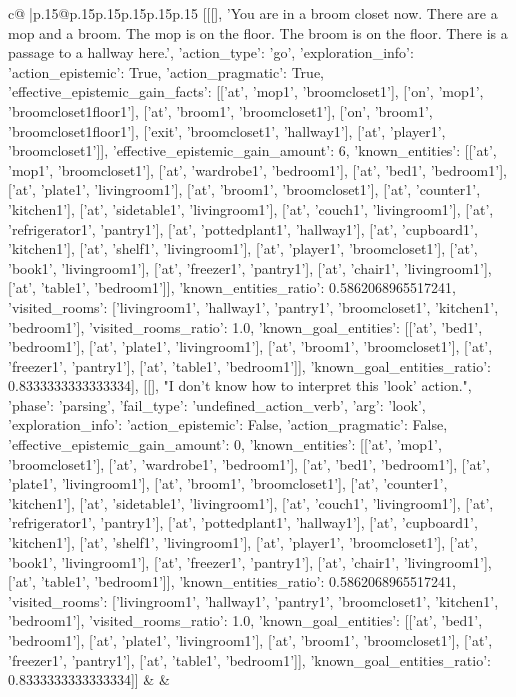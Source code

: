 \documentclass{article}
\begin{document}
{\begin{supertabular}{c@{$\;$}|p{.15\linewidth}@{}p{.15\linewidth}p{.15\linewidth}p{.15\linewidth}p{.15\linewidth}p{.15\linewidth}}
{{{	 [[[], 'You are in a broom closet now. There are a mop and a broom. The mop is on the floor. The broom is on the floor. There is a passage to a hallway here.', {'action_type': 'go', 'exploration_info': {'action_epistemic': True, 'action_pragmatic': True, 'effective_epistemic_gain_facts': [['at', 'mop1', 'broomcloset1'], ['on', 'mop1', 'broomcloset1floor1'], ['at', 'broom1', 'broomcloset1'], ['on', 'broom1', 'broomcloset1floor1'], ['exit', 'broomcloset1', 'hallway1'], ['at', 'player1', 'broomcloset1']], 'effective_epistemic_gain_amount': 6, 'known_entities': [['at', 'mop1', 'broomcloset1'], ['at', 'wardrobe1', 'bedroom1'], ['at', 'bed1', 'bedroom1'], ['at', 'plate1', 'livingroom1'], ['at', 'broom1', 'broomcloset1'], ['at', 'counter1', 'kitchen1'], ['at', 'sidetable1', 'livingroom1'], ['at', 'couch1', 'livingroom1'], ['at', 'refrigerator1', 'pantry1'], ['at', 'pottedplant1', 'hallway1'], ['at', 'cupboard1', 'kitchen1'], ['at', 'shelf1', 'livingroom1'], ['at', 'player1', 'broomcloset1'], ['at', 'book1', 'livingroom1'], ['at', 'freezer1', 'pantry1'], ['at', 'chair1', 'livingroom1'], ['at', 'table1', 'bedroom1']], 'known_entities_ratio': 0.5862068965517241, 'visited_rooms': ['livingroom1', 'hallway1', 'pantry1', 'broomcloset1', 'kitchen1', 'bedroom1'], 'visited_rooms_ratio': 1.0, 'known_goal_entities': [['at', 'bed1', 'bedroom1'], ['at', 'plate1', 'livingroom1'], ['at', 'broom1', 'broomcloset1'], ['at', 'freezer1', 'pantry1'], ['at', 'table1', 'bedroom1']], 'known_goal_entities_ratio': 0.8333333333333334}}], [[], "I don't know how to interpret this 'look' action.", {'phase': 'parsing', 'fail_type': 'undefined_action_verb', 'arg': 'look', 'exploration_info': {'action_epistemic': False, 'action_pragmatic': False, 'effective_epistemic_gain_amount': 0, 'known_entities': [['at', 'mop1', 'broomcloset1'], ['at', 'wardrobe1', 'bedroom1'], ['at', 'bed1', 'bedroom1'], ['at', 'plate1', 'livingroom1'], ['at', 'broom1', 'broomcloset1'], ['at', 'counter1', 'kitchen1'], ['at', 'sidetable1', 'livingroom1'], ['at', 'couch1', 'livingroom1'], ['at', 'refrigerator1', 'pantry1'], ['at', 'pottedplant1', 'hallway1'], ['at', 'cupboard1', 'kitchen1'], ['at', 'shelf1', 'livingroom1'], ['at', 'player1', 'broomcloset1'], ['at', 'book1', 'livingroom1'], ['at', 'freezer1', 'pantry1'], ['at', 'chair1', 'livingroom1'], ['at', 'table1', 'bedroom1']], 'known_entities_ratio': 0.5862068965517241, 'visited_rooms': ['livingroom1', 'hallway1', 'pantry1', 'broomcloset1', 'kitchen1', 'bedroom1'], 'visited_rooms_ratio': 1.0, 'known_goal_entities': [['at', 'bed1', 'bedroom1'], ['at', 'plate1', 'livingroom1'], ['at', 'broom1', 'broomcloset1'], ['at', 'freezer1', 'pantry1'], ['at', 'table1', 'bedroom1']], 'known_goal_entities_ratio': 0.8333333333333334}}]] 
	  } 
	   } 
	   } 
	 & & \\ 
 


\end{supertabular}}
\end{document}
